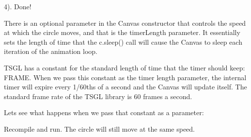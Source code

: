 4). Done!

There is an optional parameter in the Canvas constructor that controls the speed at which the circle moves, and that is the {\ttfamily timer\+Length} parameter. It essentially sets the length of time that the {\ttfamily c.\+sleep()} call will cause the Canvas to sleep each iteration of the animation loop.

T\+S\+GL has a constant for the standard length of time that the timer should keep\+: {\ttfamily F\+R\+A\+ME}. When we pass this constant as the timer length parameter, the internal timer will expire every 1/60ths of a second and the Canvas will update itself. The standard frame rate of the T\+S\+GL library is 60 frames a second.

Let\textquotesingle{}s see what happens when we pass that constant as a parameter\+:


\begin{DoxyCode}{0}
\DoxyCodeLine{\textcolor{preprocessor}{\#include <tsgl.h>}}
\DoxyCodeLine{}
\DoxyCodeLine{  \textcolor{comment}{//Store the x and y-\/coordinate values in variables outside of the loop}}
\DoxyCodeLine{  \textcolor{comment}{//Let's draw a circle!}}
\DoxyCodeLine{  \textcolor{comment}{//Drawing loop}}
\DoxyCodeLine{    \textcolor{comment}{//Check to see if we are off screen}}
\DoxyCodeLine{    \}}
\DoxyCodeLine{    \textcolor{comment}{//Pass the x and y coordinates}}
\DoxyCodeLine{    \textcolor{comment}{//And change the x-\/coordinate once the circle has been drawn}}
\DoxyCodeLine{  \}}
\DoxyCodeLine{\}}
\end{DoxyCode}


Recompile and run. The circle will still move at the same speed.

